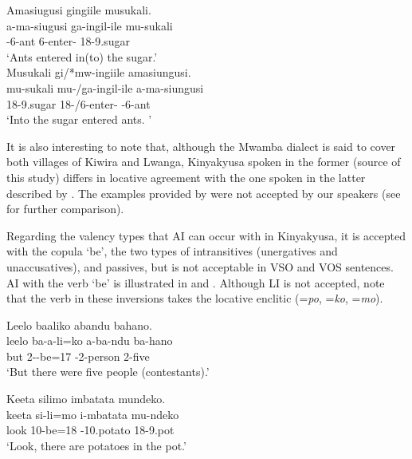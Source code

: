 \documentclass[output=paper]{langscibook}
\begin{document}
\ea
\label{bkm:Ref147926994}
\ea
Amasiugusi gingiile musukali. \\
\gll
a-ma-siugusi   ga-ingil-ile   mu-sukali \\
\AUG{}-6-ant   6\SM{}-enter-\PFV{}   18-9.sugar\\
\glt
‘Ants entered in(to) the sugar.’\\

\ex
Musukali gi/*mw-ingiile amasiungusi. \\
\gll
mu-sukali   mu-/ga-ingil-ile   a-ma-siungusi \\
18-9.sugar   18\SM{}-/6\SM{}-enter-\PFV{}   \AUG{}-6-ant \\
\glt ‘Into the sugar entered ants. \citep[162]{MsovelaEtAl2023}’

\z
\z

It is also interesting to note that, although the Mwamba dialect is said to cover both villages of Kiwira and Lwanga, Kinyakyusa spoken in the former (source of this study) differs in locative agreement with the one spoken in the latter described by \citet{Persohn2020}. The examples provided by \citet[95]{Persohn2020} were not accepted by our speakers (see \citealt{MsovelaEtAl2023} for further comparison). 

Regarding the valency types that AI can occur with in Kinyakyusa, it is accepted with the copula ‘be’, the two types of intransitives (unergatives and unaccusatives), and passives, but is not acceptable in VSO and VOS sentences. AI with the verb ‘be’ is illustrated in  and . Although LI is not accepted, note that the verb in these inversions takes the locative enclitic (=\textit{po}, =\textit{ko}, =\textit{mo}).

\ea
\label{bkm:Ref122598914}
Leelo baaliko abandu bahano.\\
\gll
leelo  ba-a-li=ko  a-ba-ndu  ba-hano\\
but  2\SM{}-\PST{}-be=17  \AUG{}-2-person  2-five\\
\glt
‘But there were five people (contestants).’ \citep[166]{MsovelaEtAl2023}\\

\z


\ea
\label{bkm:Ref122598922}
Keeta silimo imbatata mundeko.\\
\gll
keeta  si-li=mo  i-mbatata  mu-ndeko\\
look  10\SM{}-be=18  \AUG{}-10.potato  18-9.pot\\
\glt
‘Look, there are potatoes in the pot.’ \citep[166]{MsovelaEtAl2023}\\
\end{document}
